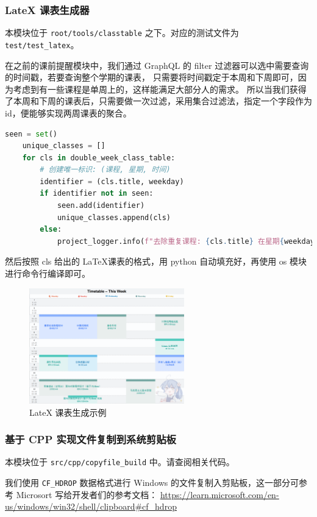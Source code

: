 \subsubsection{LateX 课表生成器}

本模块位于 \texttt{root/tools/classtable} 之下。对应的测试文件为 \texttt{test/test\_latex}。

在之前的课前提醒模块中，我们通过 GraphQL 的 filter 过滤器可以选中需要查询的时间戳，若要查询整个学期的课表，
只需要将时间戳定于本周和下周即可，因为考虑到有一些课程是单周上的，这样能满足大部分人的需求。
所以当我们获得了本周和下周的课表后，只需要做一次过滤，采用集合过滤法，指定一个字段作为 id，便能够实现两周课表的聚合。

\begin{lstlisting}[language = python]
    seen = set()
    unique_classes = []
    for cls in double_week_class_table:
        # 创建唯一标识: (课程, 星期, 时间)
        identifier = (cls.title, weekday)
        if identifier not in seen:
            seen.add(identifier)
            unique_classes.append(cls)
        else:
            project_logger.info(f"去除重复课程: {cls.title} 在星期{weekday + 1} {class_time}")
\end{lstlisting}

然后按照 cls 给出的 \LaTeX 课表的格式，用 python 自动填充好，再使用 os 模块进行命令行编译即可。

\begin{figure}[H]
    \centering
    \includegraphics[width=0.6\textwidth]{img/classtable_example.png}
    \caption{LateX 课表生成示例}
    \label{fig:latex_table}
\end{figure}

\subsubsection{基于 CPP 实现文件复制到系统剪贴板}

\begin{note}
    本模块位于 \texttt{src/cpp/copyfile\_build} 中。请查阅相关代码。

    我们使用 \texttt{CF\_HDROP} 数据格式进行 Windows 的文件复制入剪贴板，这一部分可参考 Microsort 写给开发者们的参考文档：
    \href{https://learn.microsoft.com/en-us/windows/win32/shell/clipboard#cf_hdrop}{\underline{https://learn.microsoft.com/en-us/windows/win32/shell/clipboard\#cf\_hdrop}}
\end{note}

